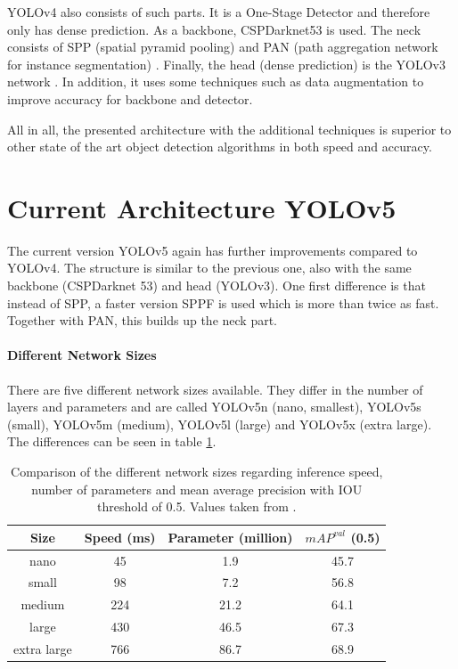 YOLOv4 \cite{yolov4} also consists of such parts. It is a One-Stage Detector and therefore only has dense prediction. As a backbone, CSPDarknet53 \cite{Wang_2020_CVPR_Workshops} is used. The neck consists of SPP (spatial pyramid pooling) \cite{7005506} and PAN (path aggregation network for instance segmentation) \cite{Liu_2018_CVPR}. Finally, the head (dense prediction) is the YOLOv3 network \cite{yolov3}. In addition, it uses some techniques such as data augmentation to improve accuracy for backbone and detector. 

All in all, the presented architecture with the additional techniques is superior to other state of the art object detection algorithms in both speed and accuracy. 

\section{Current Architecture YOLOv5} 

The current version YOLOv5 \cite{yolov5} again has further improvements compared to YOLOv4. The structure is similar to the previous one, also with the same backbone (CSPDarknet 53) and head (YOLOv3). One first difference is that instead of SPP, a faster version SPPF is used which is more than twice as fast. Together with PAN, this builds up the neck part.

\paragraph{Different Network Sizes}
There are five different network sizes available. They differ in the number of layers and parameters and are called YOLOv5n (nano, smallest), YOLOv5s (small), YOLOv5m (medium), YOLOv5l (large) and YOLOv5x (extra large). The differences can be seen in table \ref{tab:network_sizes}.

\begin{table}[h!]
	\centering
	\begin{tabular}{|c c c c|} 
		\hline
		Size & Speed (ms) & Parameter (million) & $ mAP^{val} $ (0.5)\\ %
		\hline
		nano & 45 & 1.9 & 45.7 \\
		small & 98 & 7.2 & 56.8 \\
		medium & 224 & 21.2 & 64.1 \\
		large & 430 & 46.5 & 67.3 \\
		extra large & 766 & 86.7 & 68.9 \\
		\hline
	\end{tabular}
	\caption{Comparison of the different network sizes regarding inference speed, number of parameters and mean average precision with IOU threshold of 0.5. Values taken from \cite{yolov5}.}
	\label{tab:network_sizes}
\end{table}

